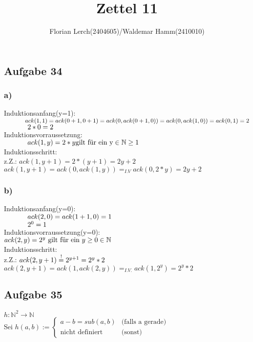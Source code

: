 \documentclass[11pt]{amsart}
\title{Zettel 11}
\author{Florian Lerch(2404605)/Waldemar Hamm(2410010)}
\begin{document}
\maketitle

\subsection*{Aufgabe 34}
\subsubsection*{a)}%
Induktionsanfang(y=1): \\ %
\(\hspace*{1.2cm} ack(1,1) = ack(0+1,0+1) = ack(0,ack(0+1,0)) = ack(0,ack(1,0)) = ack(0,1) = 2 \)\\
\(\hspace*{1.2cm} 2*0 = 2 \)\\
Induktionsvorraussetzung: \\ %
\(\hspace*{1.2cm} ack(1,y) = 2 * y \mbox{gilt für ein y} \in \mathbb{N} \geq 1 \) \\
Induktionsschritt: \\
z.Z.: $ack(1,y+1) = 2*(y+1) = 2y + 2 $ \\
$ack(1,y+1) = ack(0,ack(1,y)) =_{I.V} ack(0,2*y) = 2y+2$
\subsubsection*{b)}%
Induktionsanfang(y=0): \\
\(\hspace*{1.2cm} ack(2,0) = ack(1+1,0) = 1 \) \\
\(\hspace*{1.2cm} 2^0 = 1 \) \\
Induktionsvorraussetzung(y=0): \\
\( ack(2,y) = 2^y \mbox{ gilt für ein } y \geq 0  \in \mathbb{N} \) \\
Induktionsschritt: \\
z.Z.: \( ack(2,y+1) \overset{!}{=} 2^{y+1} = 2^{y}*2 \) \\
\( ack(2,y+1) = ack(1,ack(2,y)) =_{I.V.} ack(1,2^{y}) = 2^{y}*2\)

\subsection*{Aufgabe 35} %
\(h: \mathbb{N}^2 \rightarrow \mathbb{N}\) \\
Sei \(h(a,b) := \begin{cases} a-b = sub(a,b) &\mbox{(falls } \mbox{a gerade)} \\ \mbox{nicht definiert} &\mbox{(sonst)} \end{cases}\)
\end{document}
